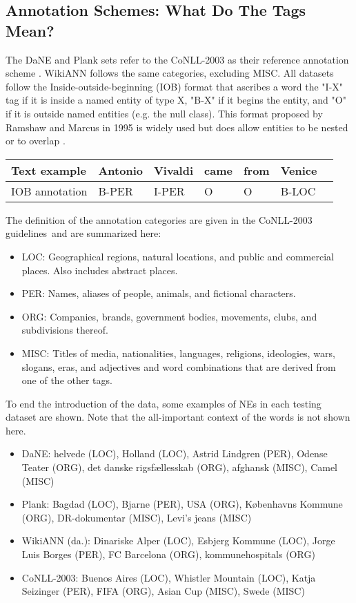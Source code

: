 \documentclass[main.tex]{subfiles}
\begin{document}
\subsection{Annotation Schemes: What Do The Tags Mean?}
\label{subsec:annoschemes}
The DaNE and Plank sets refer to the CoNLL-2003 as their reference annotation scheme \cite[Sec. 4]{hvingelby2020dane} \cite[Sec. 2.1]{plank2019neural}.
WikiANN follows the same categories, excluding MISC.
All datasets follow the Inside-outside-beginning (IOB) format that ascribes a word the "I-X" tag if it is inside a named entity of type X, "B-X" if it begins the entity, and "O" if it is outside named entities (e.g. the null class).
This format proposed by Ramshaw and Marcus in 1995 is widely used but does allow entities to be nested or to overlap \cite{ramshaw1995IOB}.

\begin{table}[H]
    \centering
    \begin{tabular}{l|llllll}
        Text example      & Antonio & Vivaldi & came & from & Venice\\\hline
        IOB annotation    & B-PER   & I-PER   &  O   & O    & B-LOC   \\
    \end{tabular}
\end{table}\noindent
The definition of the annotation categories are given in the CoNLL-2003 guidelines\footnotemark~and are summarized here:
\begin{itemize}
    \item LOC: Geographical regions, natural locations, and public and commercial places. Also includes abstract places.
    \item PER: Names, aliases of people, animals, and fictional characters.
    \item ORG: Companies, brands, government bodies, movements, clubs, and subdivisions thereof.
    \item MISC: Titles of media, nationalities, languages, religions, ideologies, wars, slogans, eras, and adjectives and word combinations that are derived from one of the other tags.
\end{itemize}
To end the introduction of the data, some examples of NEs in each testing dataset are shown.
Note that the all-important context of the words is not shown here.
\begin{itemize}
    \item DaNE: helvede (LOC), Holland (LOC), Astrid Lindgren (PER), Odense Teater (ORG), det danske rigsfællesskab (ORG), afghansk (MISC), Camel (MISC)
    \item Plank: Bagdad (LOC), Bjarne (PER), USA (ORG), Københavns Kommune (ORG), DR-dokumentar (MISC), Levi's jeans (MISC)
    \item WikiANN (da.): Dinariske Alper (LOC), Esbjerg Kommune (LOC), Jorge Luis Borges (PER), FC Barcelona (ORG), kommunehospitals (ORG)
    \item CoNLL-2003: Buenos Aires (LOC), Whistler Mountain (LOC), Katja Seizinger (PER),  FIFA (ORG), Asian Cup (MISC), Swede (MISC)
\end{itemize}
\end{document}
